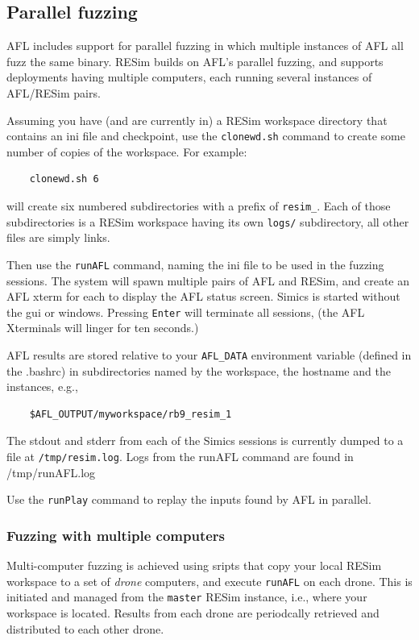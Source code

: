 \documentclass[titlepage]{article}
\begin{document}
\subsection{Parallel fuzzing}
\label{parallel-fuzzing}
AFL includes support for parallel fuzzing in which multiple instances of AFL all fuzz the same binary.
RESim builds on AFL's parallel fuzzing, and supports deployments having multiple computers, each running
several instances of AFL/RESim pairs.

Assuming you have (and are currently in) a RESim workspace directory that contains an ini file and checkpoint, use the {\tt clonewd.sh}
command to create some number of copies of the workspace.  For example:
\begin{verbatim}
    clonewd.sh 6
\end{verbatim}
\noindent will create six numbered subdirectories with a prefix of {\tt resim\_}.  Each of those subdirectories is a RESim workspace
having its own {\tt logs/} subdirectory,  all other files are simply links.

Then use the {\tt runAFL} command, naming the ini file to be used in the fuzzing sessions.  The system will spawn multiple pairs of
AFL and RESim, and create an AFL xterm for each to display the AFL status screen.  Simics is started without the gui or windows.
Pressing {\tt Enter} will terminate all sessions, (the AFL Xterminals will linger for ten seconds.)

AFL results are stored relative to your {\tt AFL\_DATA} environment variable (defined in the .bashrc) in subdirectories named by the workspace, the hostname and the instances, e.g.,
\begin{verbatim}
    $AFL_OUTPUT/myworkspace/rb9_resim_1
\end{verbatim}
The stdout and stderr from each of the Simics sessions is currently dumped to a file at {\tt /tmp/resim.log}.
Logs from the runAFL command are found in /tmp/runAFL.log

Use the {\tt runPlay} command to replay the inputs found by AFL in parallel.

\subsubsection{Fuzzing with multiple computers}
\label{fuzz-drones}
Multi-computer fuzzing is achieved using sripts that copy your local RESim workspace to a set of \textit{drone} computers,
and execute {\tt runAFL} on each drone.  This is initiated and managed from the {\tt master} RESim instance, i.e., where your 
workspace is located.  Results from each drone are periodcally retrieved and distributed to each other drone.
\end{document}
